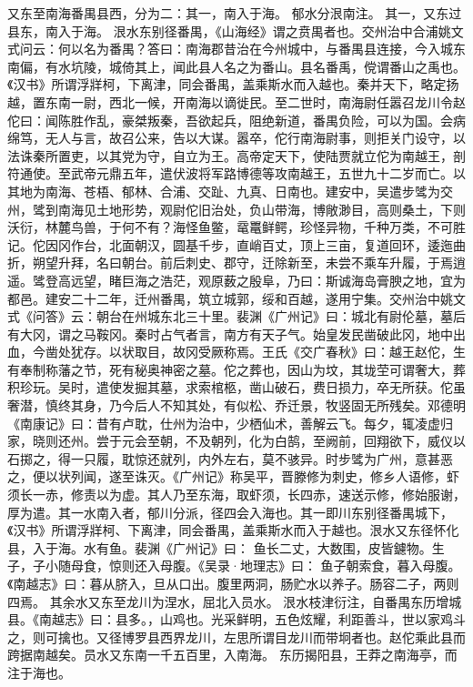 \documentclass[12pt,UTF8]{ctexbook}
\begin{document}
又东至南海番禺县西，分为二：其一，南入于海。
郁水分泿南注。
其一，又东过县东，南入于海。
泿水东别径番禺，《山海经》谓之贲禺者也。交州治中合浦姚文式问云：何以名为番禺？答曰：南海郡昔治在今州城中，与番禺县连接，今入城东南偏，有水坑陵，城倚其上，闻此县人名之为番山。县名番禹，傥谓番山之禹也。《汉书》所谓浮牂柯，下离津，同会番禺，盖乘斯水而入越也。秦并天下，略定扬越，置东南一尉，西北一候，开南海以谪徙民。至二世时，南海尉任嚣召龙川令赵佗曰：闻陈胜作乱，豪桀叛秦，吾欲起兵，阻绝新道，番禺负险，可以为国。会病绵笃，无人与言，故召公来，告以大谋。嚣卒，佗行南海尉事，则拒关门设守，以法诛秦所置吏，以其党为守，自立为王。高帝定天下，使陆贾就立佗为南越王，剖符通使。至武帝元鼎五年，遣伏波将军路博德等攻南越王，五世九十二岁而亡。以其地为南海、苍梧、郁林、合浦、交趾、九真、日南也。建安中，吴遣步骘为交州，骘到南海见土地形势，观尉佗旧治处，负山带海，博敞渺目，高则桑土，下则沃衍，林麓鸟兽，于何不有？海怪鱼鳖，鼋鼍鲜鳄，珍怪异物，千种万类，不可胜记。佗因冈作台，北面朝汉，圆基千步，直峭百丈，顶上三亩，复道回环，逶迤曲折，朔望升拜，名曰朝台。前后刺史、郡守，迁除新至，未尝不乘车升履，于焉逍遥。骘登高远望，睹巨海之浩茫，观原薮之殷阜，乃曰：斯诚海岛膏腴之地，宜为都邑。建安二十二年，迁州番禺，筑立城郭，绥和百越，遂用宁集。交州治中姚文式《问答》云：朝台在州城东北三十里。裴渊《广州记》曰：城北有尉伦墓，墓后有大冈，谓之马鞍冈。秦时占气者言，南方有天子气。始皇发民凿破此冈，地中出血，今凿处犹存。以状取目，故冈受厥称焉。王氏《交广春秋》曰：越王赵佗，生有奉制称藩之节，死有秘奥神密之墓。佗之葬也，因山为坟，其垅茔可谓奢大，葬积珍玩。吴时，遣使发掘其墓，求索棺柩，凿山破石，费日损力，卒无所获。佗虽奢潜，慎终其身，乃今后人不知其处，有似松、乔迁景，牧竖固无所残矣。邓德明《南康记》曰：昔有卢耽，仕州为治中，少栖仙术，善解云飞。每夕，辄凌虚归家，晓则还州。尝于元会至朝，不及朝列，化为白鹄，至阙前，回翔欲下，威仪以石掷之，得一只履，耽惊还就列，内外左右，莫不骇异。时步骘为广州，意甚恶之，便以状列闻，遂至诛灭。《广州记》称吴平，晋滕修为刺史，修乡人语修，虾须长一赤，修责以为虚。其人乃至东海，取虾须，长四赤，速送示修，修始服谢，厚为遣。其一水南入者，郁川分派，径四会入海也。其一即川东别径番禺城下，《汉书》所谓浮牂柯、下离津，同会番禺，盖乘斯水而入于越也。泿水又东径怀化县，入于海。水有鱼。裴渊《广州记》曰： 鱼长二丈，大数围，皮皆鑢物。生子，子小随母食，惊则还入母腹。《吴录·地理志》曰： 鱼子朝索食，暮入母腹。《南越志》曰：暮从脐入，旦从口出。腹里两洞，肠贮水以养子。肠容二子，两则四焉。
其余水又东至龙川为涅水，屈北入员水。
泿水枝津衍注，自番禺东历增城县。《南越志》曰：县多。，山鸡也。光采鲜明，五色炫耀，利距善斗，世以家鸡斗之，则可擒也。又径博罗县西界龙川，左思所谓目龙川而带坰者也。赵佗乘此县而跨据南越矣。员水又东南一千五百里，入南海。
东历揭阳县，王莽之南海亭，而注于海也。
\end{document}
